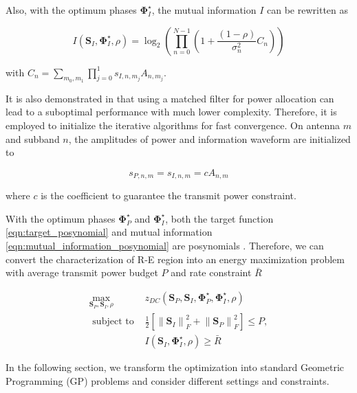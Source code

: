 Also, with the optimum phases ${\mathbf{\Phi }}_I^ \star $, the mutual information $I$ can be rewritten as

\begin{equation}\label{eqn:mutual_information_posynomial}
  I\left( {{{\mathbf{S}}_I},{\mathbf{\Phi }}_I^ \star ,\rho } \right) = {\log _2}\left( {\prod\limits_{n = 0}^{N - 1} {\left( {1 + \frac{{(1 - \rho )}}{{\sigma _n^2}}{C_n}} \right)} } \right)
\end{equation}

with ${C_n} = \sum\nolimits_{{m_0},{m_1}} {\prod\nolimits_{j = 0}^1 {{s_{I,n,{m_j}}}{A_{n,{m_j}}}} } $.

It is also demonstrated in \cite{Clerckx2017} that using a matched filter for power allocation can lead to a suboptimal performance with much lower complexity. Therefore, it is employed to initialize the iterative algorithms for fast convergence. On antenna $m$ and subband $n$, the amplitudes of power and information waveform are initialized to

\begin{equation}\label{eqn:initial_amplitude}
  {s_{P,n,m}} = {s_{I,n,m}} = c{A_{n,m}}
\end{equation}

where $c$ is the coefficient to guarantee the transmit power constraint.

With the optimum phases ${\mathbf{\Phi }}_P^ \star $ and ${\mathbf{\Phi }}_I^ \star $, both the target function \eqref{eqn:target_posynomial} and mutual information \eqref{eqn:mutual_information_posynomial} are posynomials \cite{Boyd2007}. Therefore, we can convert the characterization of R-E region into an energy maximization problem with average transmit power budget $P$ and rate constraint ${\bar R}$

\begin{eqnarray}
  {\mathop {\max }\limits_{{{\mathbf{S}}_P},{{\mathbf{S}}_I},\rho } }&{{z_{DC}}\left( {{{\mathbf{S}}_P},{{\mathbf{S}}_I},{\mathbf{\Phi }}_P^ \star ,{\mathbf{\Phi }}_I^ \star ,\rho } \right)} \label{eqn:original_target}\\
  {{\text{ subject to }}}&{\frac{1}{2}\left[ {\left\| {{{\mathbf{S}}_I}} \right\|_F^2 + \left\| {{{\mathbf{S}}_P}} \right\|_F^2} \right] \leqslant P,} \label{eqn:original_power_constraint} \\
  {}&{I\left( {{{\mathbf{S}}_I},{\mathbf{\Phi }}_I^ \star ,\rho } \right) \geqslant \bar R} \label{eqn:original_rate_constraint}
\end{eqnarray}

In the following section, we transform the optimization into standard Geometric Programming (GP) problems and consider different settings and constraints. 